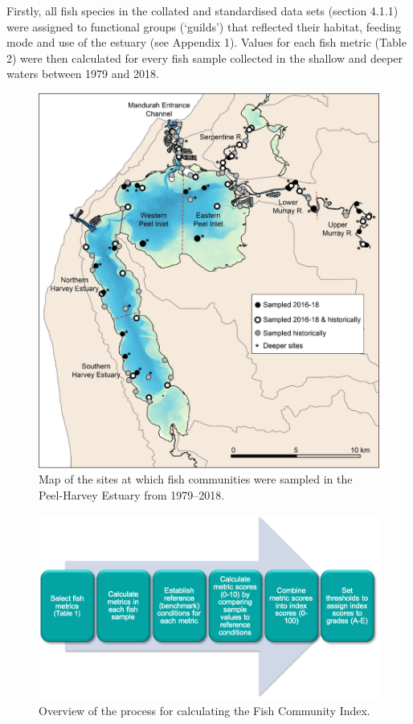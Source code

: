 \documentclass[
]{book}
\begin{document}
Firstly, all fish species in the collated and standardised data sets (section 4.1.1) were assigned to functional groups (`guilds') that reflected their habitat, feeding mode and use of the estuary (see Appendix 1). Values for each fish metric (Table 2) were then calculated for every fish sample collected in the shallow and deeper waters between 1979 and 2018.~

\begin{figure}
\includegraphics[width=0.75\linewidth]{images/fish_ecology/picture4} \caption{Map of the sites at which fish communities were sampled in the Peel-Harvey Estuary from 1979–2018.}\label{fig:fish-ecology-pic4}
\end{figure}

\begin{figure}
\includegraphics[width=0.75\linewidth]{images/fish_ecology/picture5} \caption{Overview of the process for calculating the Fish Community Index.}\label{fig:fish-ecology-pic5}
\end{figure}
\end{document}
